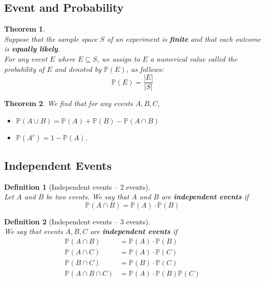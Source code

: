 \documentclass[12pt]{article}
\newtheorem{definition}{Definition}[section]
\newtheorem{theorem}{Theorem}[section]
\theoremstyle{definition}
\begin{document}
\subsection{Event and Probability}
\begin{theorem}
\hfill\\\normalfont Suppose that the sample space $S$ of an experiment is \textbf{finite} and that each outcome is \textbf{equally likely}.\\For any event $E$ where $E\subseteq S$, we assign to $E$ a numerical value called the probability of $E$ and denoted by $\mathbb{P}(E)$, as follows:
\[
\mathbb{P}(E)=\frac{|E|}{|S|}
\]
\end{theorem}
\begin{theorem}\normalfont We find that for any events $A, B, C$,
\begin{itemize}
  \item $\mathbb{P}(A\cup B)=\mathbb{P}(A)+\mathbb{P}(B)-\mathbb{P}(A\cap B)$
  \item $\mathbb{P}(A^c)=1-\mathbb{P}(A)$.
\end{itemize}
\end{theorem}
\subsection{Independent Events}
\begin{definition}[Independent events -- 2 events]\hfill\\\normalfont Let $A$ and $B$ be two events. We say that $A$ and $B$ are \textbf{independent events} if
\[
\mathbb{P}(A\cap B)=\mathbb{P}(A)\cdot \mathbb{P}(B)
\]
\end{definition}
\begin{definition}[Independent events -- 3 events]\hfill\\\normalfont We say that events $A, B, C$ are \textbf{independent events} if
\begin{align*}
\mathbb{P}(A\cap B)&=\mathbb{P}(A)\cdot \mathbb{P}(B)\\
\mathbb{P}(A\cap C)&=\mathbb{P}(A)\cdot \mathbb{P}(C)\\
\mathbb{P}(B\cap C)&=\mathbb{P}(B)\cdot \mathbb{P}(C)\\
\mathbb{P}(A\cap B\cap C)&=\mathbb{P}(A)\cdot \mathbb{P}(B)\mathbb{P}(C)\\
\end{align*}
\end{definition}
\end{document}
